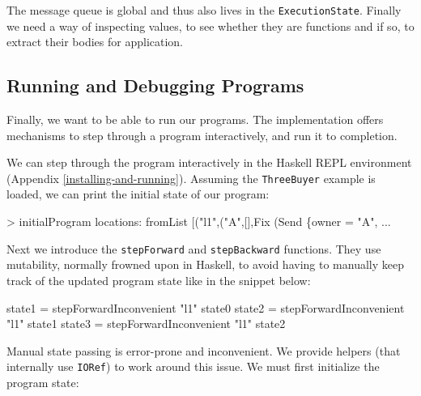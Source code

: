 \documentclass[runningheads,plain]{llncs}
\newenvironment{Shaded}{}{}
\newcommand{\DataTypeTok}[1]{\textcolor[rgb]{0.56,0.13,0.00}{#1}}
\newcommand{\StringTok}[1]{\textcolor[rgb]{0.25,0.44,0.63}{#1}}
\newcommand{\FunctionTok}[1]{\textcolor[rgb]{0.02,0.16,0.49}{#1}}
\newcommand{\NormalTok}[1]{#1}
\begin{document}
The message queue is global and thus also lives in the
\texttt{ExecutionState}. Finally we need a way of inspecting values, to
see whether they are functions and if so, to extract their bodies for
application.

\subsection{Running and Debugging Programs}\label{running-debugging}

Finally, we want to be able to run our programs. The implementation
offers mechanisms to step through a program interactively, and run it to
completion.

We can step through the program interactively in the Haskell REPL
environment (Appendix \ref{installing-and-running}). Assuming the
\texttt{ThreeBuyer} example is loaded, we can print the initial state of
our program:

\begin{Shaded}
\begin{Highlighting}[]
\FunctionTok{>}\NormalTok{ initialProgram}
\NormalTok{locations}\FunctionTok{:}\NormalTok{ fromList [(}\StringTok{"l1"}\NormalTok{,(}\StringTok{"A"}\NormalTok{,[],}\DataTypeTok{Fix}\NormalTok{ (}\DataTypeTok{Send}\NormalTok{ \{owner }\FunctionTok{=} \StringTok{"A"}\NormalTok{, }\FunctionTok{...} 
\end{Highlighting}
\end{Shaded}

Next we introduce the \texttt{stepForward} and \texttt{stepBackward}
functions. They use mutability, normally frowned upon in Haskell, to
avoid having to manually keep track of the updated program state like in
the snippet below:

\begin{Shaded}
\begin{Highlighting}[]
\NormalTok{state1 }\FunctionTok{=}\NormalTok{ stepForwardInconvenient }\StringTok{"l1"}\NormalTok{ state0}
\NormalTok{state2 }\FunctionTok{=}\NormalTok{ stepForwardInconvenient }\StringTok{"l1"}\NormalTok{ state1}
\NormalTok{state3 }\FunctionTok{=}\NormalTok{ stepForwardInconvenient }\StringTok{"l1"}\NormalTok{ state2}
\end{Highlighting}
\end{Shaded}

Manual state passing is error-prone and inconvenient. We provide helpers
(that internally use \texttt{IORef}) to work around this issue. We must
first initialize the program state:
\end{document}
